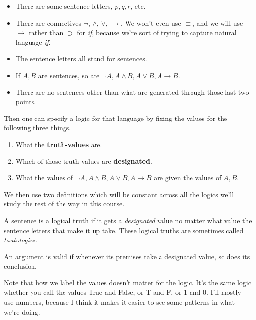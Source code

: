 \documentclass[
]{article}
\providecommand{\tightlist}{%
  \setlength{\itemsep}{0pt}\setlength{\parskip}{0pt}}\usepackage{longtable,booktabs,array}
\begin{document}
\begin{itemize}
\tightlist
\item
  There are some sentence letters, \(p, q, r\), etc.
\item
  There are connectives \(\neg\), \(\wedge\), \(\vee\), \(\rightarrow\).
  We won't even use \(\equiv\), and we will use \(\rightarrow\) rather
  than \(\supset\) for \emph{if}, because we're sort of trying to
  capture natural language \emph{if}.
\item
  The sentence letters all stand for sentences.
\item
  If \(A, B\) are sentences, so are
  \(\neg A, A \wedge B, A \vee B, A \rightarrow B\).
\item
  There are no sentences other than what are generated through those
  last two points.
\end{itemize}

Then one can specify a logic for that language by fixing the values for
the following three things.

\begin{enumerate}
\def\labelenumi{\arabic{enumi}.}
\tightlist
\item
  What the \textbf{truth-values} are.
\item
  Which of those truth-values are \textbf{designated}.
\item
  What the values of \(\neg A, A \wedge B, A \vee B, A \rightarrow B\)
  are given the values of \(A, B\).
\end{enumerate}

We then use two definitions which will be constant across all the logics
we'll study the rest of the way in this course.

\begin{description}
\tightlist
\item[Logical Truth]
A sentence is a logical truth if it gets a \emph{designated} value no
matter what value the sentence letters that make it up take. These
logical truths are sometimes called \emph{tautologies}.
\item[Validity]
An argument is valid if whenever its premises take a designated value,
so does its conclusion.
\end{description}

Note that how we label the values doesn't matter for the logic. It's the
same logic whether you call the values True and False, or T and F, or 1
and 0. I'll mostly use numbers, because I think it makes it easier to
see some patterns in what we're doing.
\end{document}
